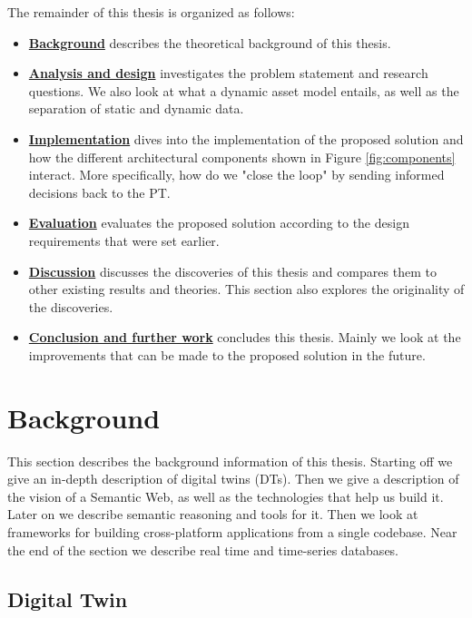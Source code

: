 \documentclass{article}
\begin{document}
The remainder of this thesis is organized as follows:
\begin{itemize}
    \item \hyperref[sec:Background]{\textbf{Background}} describes the theoretical background of this thesis.
    \item \hyperref[sec:Analysis]{\textbf{Analysis and design}} investigates the problem statement and research questions. We also look at what a dynamic asset model entails, as well as the separation of static and dynamic data.
    \item \hyperref[sec:Implementation]{\textbf{Implementation}} dives into the implementation of the proposed solution and how the different architectural components shown in Figure \ref{fig:components} interact. More specifically, how do we "close the loop" by sending informed decisions back to the PT. 
    \item \hyperref[sec:Evaluation]{\textbf{Evaluation}} evaluates the proposed solution according to the design requirements that were set earlier.
    \item \hyperref[sec:Discussion]{\textbf{Discussion}} discusses the discoveries of this thesis and compares them to other existing results and theories. This section also explores the originality of the discoveries.
    \item \hyperref[sec:Conclusion]{\textbf{Conclusion and further work}} concludes this thesis. Mainly we look at the improvements that can be made to the proposed solution in the future.  
\end{itemize}



\newpage
\section{Background}\label{sec:Background}
This section describes the background information of this thesis. Starting off we give an in-depth description of digital twins (DTs). Then we give a description of the vision of a Semantic Web, as well as the technologies that help us build it. Later on we describe semantic reasoning and tools for it.  Then we look at frameworks for building cross-platform applications from a single codebase. Near the end of the section we describe real time and time-series databases.

\subsection{Digital Twin}\label{subsec:DigitalTwins}
\end{document}
